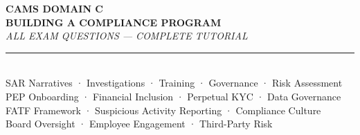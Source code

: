 \documentclass[12pt,aspectratio=169]{beamer}
\begin{document}
	
	\begin{frame}
		\centering
		\vspace{0.3cm}
		{\fontsize{18}{22}\selectfont \textbf{CAMS DOMAIN C}}\\[0.1cm]
		{\fontsize{14}{17}\selectfont \textbf{BUILDING A COMPLIANCE PROGRAM}}\\[0.15cm]
		{\fontsize{9}{11}\selectfont \textit{ALL EXAM QUESTIONS — COMPLETE TUTORIAL}}\\[0.08cm]
		\rule{4cm}{0.5pt}\\[0.08cm]
		{\fontsize{6}{7}\selectfont SAR Narratives · Investigations · Training · Governance · Risk Assessment}\\[0.04cm]
		{\fontsize{6}{7}\selectfont PEP Onboarding · Financial Inclusion · Perpetual KYC · Data Governance}\\[0.04cm]
		{\fontsize{6}{7}\selectfont FATF Framework · Suspicious Activity Reporting · Compliance Culture}\\[0.04cm]
		{\fontsize{6}{7}\selectfont Board Oversight · Employee Engagement · Third-Party Risk}
		\vspace{0.2cm}
	\end{frame}
	
\end{document}

